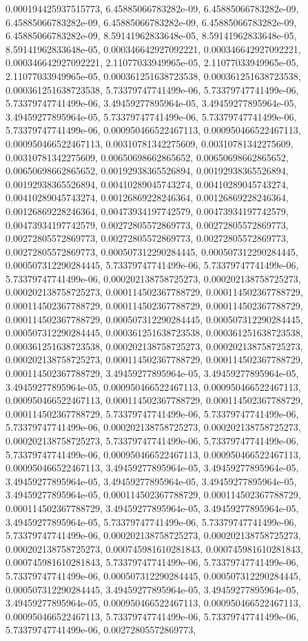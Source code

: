 \documentclass[
  ,man]{apa6}
\begin{document}
0.000194425937515773, 6.45885066783282e-09, 6.45885066783282e-09, 6.45885066783282e-09, 6.45885066783282e-09, 6.45885066783282e-09, 6.45885066783282e-09, 8.59141962833648e-05, 8.59141962833648e-05, 8.59141962833648e-05, 0.000346642927092221, 0.000346642927092221, 0.000346642927092221, 2.11077033949965e-05, 2.11077033949965e-05, 2.11077033949965e-05, 0.000361251638723538, 0.000361251638723538, 0.000361251638723538, 5.73379747741499e-06, 5.73379747741499e-06, 5.73379747741499e-06, 3.49459277895964e-05,
3.49459277895964e-05, 3.49459277895964e-05, 5.73379747741499e-06, 5.73379747741499e-06, 5.73379747741499e-06, 0.000950466522467113, 0.000950466522467113, 0.000950466522467113, 0.00310781342275609, 0.00310781342275609, 0.00310781342275609, 0.00650698662865652, 0.00650698662865652, 0.00650698662865652, 0.00192938365526894, 0.00192938365526894, 0.00192938365526894, 0.00410289045743274, 0.00410289045743274, 0.00410289045743274, 0.00126869228246364, 0.00126869228246364, 0.00126869228246364, 0.00473934197742579,
0.00473934197742579, 0.00473934197742579, 0.00272805572869773, 0.00272805572869773, 0.00272805572869773, 0.00272805572869773, 0.00272805572869773, 0.00272805572869773, 0.000507312290284445, 0.000507312290284445, 0.000507312290284445, 5.73379747741499e-06, 5.73379747741499e-06, 5.73379747741499e-06, 0.000202138758725273, 0.000202138758725273, 0.000202138758725273, 0.000114502367788729, 0.000114502367788729, 0.000114502367788729, 0.000114502367788729, 0.000114502367788729, 0.000114502367788729, 0.000507312290284445,
0.000507312290284445, 0.000507312290284445, 0.000361251638723538, 0.000361251638723538, 0.000361251638723538, 0.000202138758725273, 0.000202138758725273, 0.000202138758725273, 0.000114502367788729, 0.000114502367788729, 0.000114502367788729, 3.49459277895964e-05, 3.49459277895964e-05, 3.49459277895964e-05, 0.000950466522467113, 0.000950466522467113, 0.000950466522467113, 0.000114502367788729, 0.000114502367788729, 0.000114502367788729, 5.73379747741499e-06, 5.73379747741499e-06, 5.73379747741499e-06,
0.000202138758725273, 0.000202138758725273, 0.000202138758725273, 5.73379747741499e-06, 5.73379747741499e-06, 5.73379747741499e-06, 0.000950466522467113, 0.000950466522467113, 0.000950466522467113, 3.49459277895964e-05, 3.49459277895964e-05, 3.49459277895964e-05, 3.49459277895964e-05, 3.49459277895964e-05, 3.49459277895964e-05, 0.000114502367788729, 0.000114502367788729, 0.000114502367788729, 3.49459277895964e-05, 3.49459277895964e-05, 3.49459277895964e-05, 5.73379747741499e-06, 5.73379747741499e-06,
5.73379747741499e-06, 0.000202138758725273, 0.000202138758725273, 0.000202138758725273, 0.000745981610281843, 0.000745981610281843, 0.000745981610281843, 5.73379747741499e-06, 5.73379747741499e-06, 5.73379747741499e-06, 0.000507312290284445, 0.000507312290284445, 0.000507312290284445, 3.49459277895964e-05, 3.49459277895964e-05, 3.49459277895964e-05, 0.000950466522467113, 0.000950466522467113, 0.000950466522467113, 5.73379747741499e-06, 5.73379747741499e-06, 5.73379747741499e-06, 0.00272805572869773,
\end{document}
